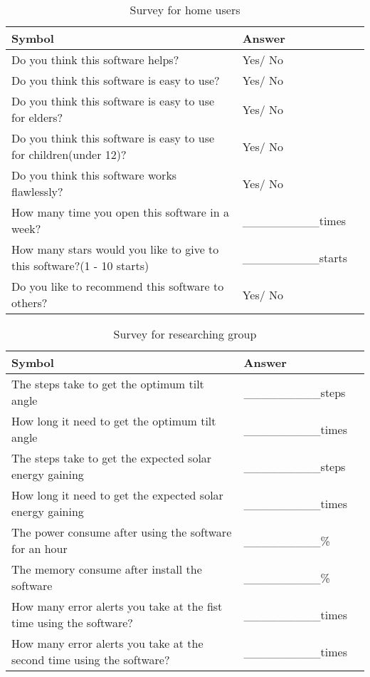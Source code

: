 \documentclass[12pt, titlepage]{article}
\begin{document}
\begin{table}[h!]
  \noindent \begin{tabular}{l l l} 
    \toprule		
    \textbf{Symbol} & \textbf{Answer} \\
    \midrule 
    Do you think this software helps? & Yes/ No  \\
    Do you think this software is easy to use? & Yes/ No  \\
    Do you think this software is easy to use for elders? & Yes/ No  \\
    Do you think this software is easy to use for children(under 12)? & Yes/ No  \\
    Do you think this software works flawlessly? & Yes/ No  \\
    How many time you open this software in a week? & \_\_\_\_\_\_\_\_\_times  \\
	 How many stars  would you like to give to this software?(1 - 10 starts) & \_\_\_\_\_\_\_\_\_starts  \\
    Do you like to recommend  this software to others? & Yes/ No  \\
    \bottomrule
  \end{tabular}
  \caption{Survey for home users}
   \label{homeSurvey}
\end{table}

\begin{table}[h!]
  \noindent \begin{tabular}{l l l} 
    \toprule		
    \textbf{Symbol} & \textbf{Answer} \\
    \midrule 
    The steps take to get the optimum tilt angle & \_\_\_\_\_\_\_\_\_steps  \\
    How long it need to get the optimum tilt angle & \_\_\_\_\_\_\_\_\_times  \\
    The steps take to get the expected solar energy gaining & \_\_\_\_\_\_\_\_\_steps  \\
    How long it need to get the expected solar energy gaining & \_\_\_\_\_\_\_\_\_times  \\
    The power consume after using the software for an hour & \_\_\_\_\_\_\_\_\_\%  \\
    The memory consume after install the software  & \_\_\_\_\_\_\_\_\_\%  \\
    How many error alerts you take at the fist time using the software? & \_\_\_\_\_\_\_\_\_times  \\
    How many error alerts you take at the second time using the software? & \_\_\_\_\_\_\_\_\_times  \\
    \bottomrule
  \end{tabular}
  \caption{Survey for researching  group}
   \label{survey}
\end{table}
\end{document}
